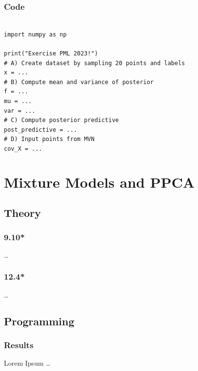 \documentclass{article}
\begin{document}
\subsubsection*{Code}

\begin{verbatim}

import numpy as np

print("Exercise PML 2023!")
# A) Create dataset by sampling 20 points and labels
x = ...
# B) Compute mean and variance of posterior
f = ...
mu = ...
var = ...
# C) Compute posterior predictive
post_predictive = ...
# D) Input points from MVN
cov_X = ...

\end{verbatim}

\section*{Mixture Models and PPCA}

\subsection*{Theory}

\subsubsection*{9.10*}
\ldots

\subsubsection*{12.4*}
\ldots

\subsection*{Programming}

\subsubsection*{Results}
Lorem Ipsum \ldots \\


\printbibliography
\end{document}
